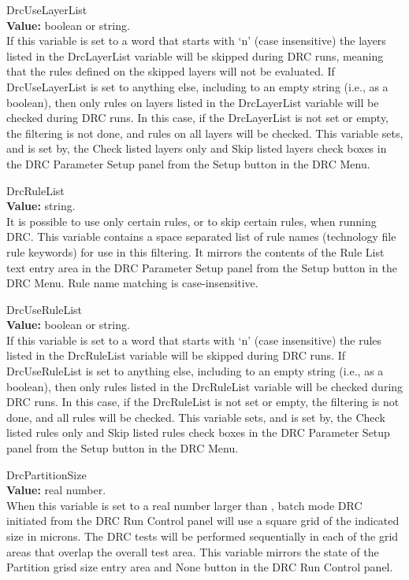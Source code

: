 \begin{description}
\item{\et DrcUseLayerList}\\
{\bf Value:} boolean or string.\\
If this variable is set to a word that starts with `{\vt n}' (case
insensitive) the layers listed in the {\et DrcLayerList} variable will
be skipped during DRC runs, meaning that the rules defined on the
skipped layers will not be evaluated.  If {\et DrcUseLayerList} is set
to anything else, including to an empty string (i.e., as a boolean),
then only rules on layers listed in the {\et DrcLayerList} variable
will be checked during DRC runs.  In this case, if the {\et
DrcLayerList} is not set or empty, the filtering is not done, and
rules on all layers will be checked.  This variable sets, and is set
by, the {\cb Check listed layers only} and {\cb Skip listed layers}
check boxes in the {\cb DRC Parameter Setup} panel from the {\cb
Setup} button in the {\cb DRC Menu}.

\item{\et DrcRuleList}\\
{\bf Value:} string.\\
It is possible to use only certain rules, or to skip certain rules,
when running DRC.  This variable contains a space separated list of
rule names (technology file rule keywords) for use in this filtering. 
It mirrors the contents of the {\cb Rule List} text entry area in the
{\cb DRC Parameter Setup} panel from the {\cb Setup} button in the
{\cb DRC Menu}.  Rule name matching is case-insensitive.

\item{\et DrcUseRuleList}\\
{\bf Value:} boolean or string.\\
If this variable is set to a word that starts with `{\vt n}' (case
insensitive) the rules listed in the {\et DrcRuleList} variable will
be skipped during DRC runs.  If {\et DrcUseRuleList} is set to
anything else, including to an empty string (i.e., as a boolean), then
only rules listed in the {\et DrcRuleList} variable will be checked
during DRC runs.  In this case, if the {\et DrcRuleList} is not set or
empty, the filtering is not done, and all rules will be checked.  This
variable sets, and is set by, the {\cb Check listed rules only} and
{\cb Skip listed rules} check boxes in the {\cb DRC Parameter Setup}
panel from the {\cb Setup} button in the {\cb DRC Menu}.

\item{\et DrcPartitionSize}\\
{\bf Value:} real number.\\
When this variable is set to a real number larger than {},
batch mode DRC initiated from the {\cb DRC Run Control} panel will use
a square grid of the indicated size in microns.  The DRC tests will be
performed sequentially in each of the grid areas that overlap the
overall test area.  This variable mirrors the state of the {\cb
Partition grisd size} entry area and {\cb None} button in the {\cb DRC
Run Control} panel.
\end{description}


